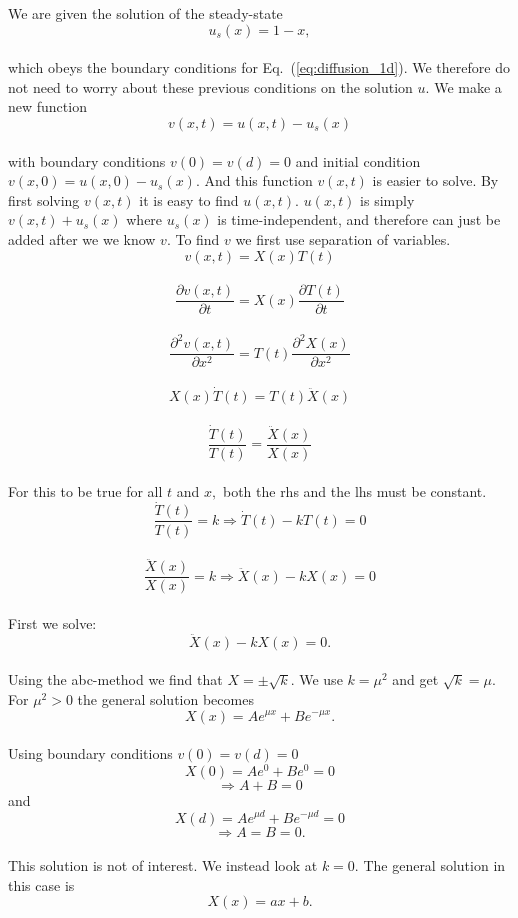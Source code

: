 \documentclass[a4paper,12pt, english]{article}
\begin{document}
We are given the solution of the steady-state 
\\
$$u_s(x) = 1 - x,$$
\\
which obeys the boundary conditions for Eq.~(\ref{eq:diffusion_1d}). We therefore do not need to worry about these previous conditions on the solution $u.$ We make a new function
\\
$$v(x,t) = u(x,t) - u_s(x)$$ 
\\
with boundary conditions $v(0) = v(d) = 0$ and initial condition $v(x,0) = u(x,0) - u_s(x).$ And this function $v(x,t)$ is easier to solve.
By first solving $v(x,t)$ it is easy to find $u(x,t).$ $u(x,t)$ is simply $v(x,t) + u_s(x)$ where $u_s(x)$ is time-independent, and therefore can just be added after we we know $v.$
To find $v$ we first use separation of variables. 
\\
$$v(x,t) = X(x)T(t)$$
\\
$$\frac{\partial v(x,t)}{\partial t} = X(x) \frac{\partial T(t)}{\partial t}$$
\\
$$\frac{\partial^2 v(x,t)}{\partial x^2} = T(t) \frac{\partial^2 X(x)}{\partial x^2}$$
\\
$$X(x)\dot{T}(t) = T(t)\ddot{X}(x)$$
\\
$$\frac{\dot{T}(t)}{T(t)} = \frac{\ddot{X}(x)}{X(x)}$$
\\
For this to be true for all $t$ and $x,$ both the rhs and the lhs must be constant.
\\
$$\frac{\dot{T}(t)}{T(t)} = k \Rightarrow \dot{T}(t) - kT(t) = 0$$
\\
$$\frac{\ddot{X}(x)}{X(x)} = k \Rightarrow \ddot{X}(x) - kX(x) = 0$$
\\
First we solve:
\\
$$\ddot{X}(x) - kX(x) = 0.$$
\\
Using the abc-method we find that $X = \pm \sqrt{k}.$
We use $k = \mu^2$ and get $\sqrt{k} = \mu.$
\\
For $\mu^2 > 0$ the general solution becomes
\\
$$X(x) = Ae^{\mu x} + Be^{-\mu x}.$$
\\
Using boundary conditions $v(0) = v(d) = 0$ 
\\
$$X(0) = Ae^0 + Be^0 = 0$$
$$\Rightarrow A + B = 0$$ and
$$X(d) = Ae^{\mu d} + Be^{-\mu d} = 0$$
$$\Rightarrow A = B = 0.$$
\\
This solution is not of interest. We instead look at $k = 0.$ The general solution in this case is
\\
$$X(x) = ax + b.$$
\\
\end{document}
